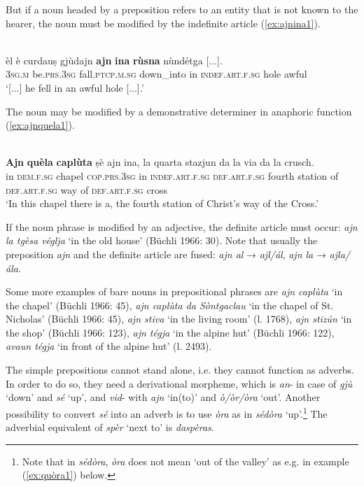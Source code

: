 But if a noun headed by a preposition refers to an entity that is not known to the hearer, the noun must be modified by the indefinite article (\ref{ex:ajnina1}).

\ea
\label{ex:ajnina1}
\\
\gll  [...] èl è curdauṣ gjùdajn \textbf{ajn} \textbf{ina} \textbf{rùsna} nùndétga [...].\\
{} \textsc{3sg.m} be.\textsc{prs.3sg} fall.\textsc{ptcp.m.sg} down\_into in \textsc{indef.art.f.sg} hole awful\\
\glt `[...] he fell in an awful hole [...].'
\z

The noun may be modified by a demonstrative determiner in anaphoric function (\ref{ex:ajnquela1}).

\ea
\label{ex:ajnquela1}
\\
\gll \textbf{Ajn} \textbf{quèla} \textbf{caplùta} ṣè ajn ina, la quarta stazjun da la via da la crusch.\\
in \textsc{dem.f.sg} chapel \textsc{cop.prs.3sg} in \textsc{indef.art.f.sg} \textsc{def.art.f.sg} fourth station of \textsc{def.art.f.sg} way of \textsc{def.art.f.sg} cross \\
\glt `In this chapel there is a, the fourth station of Christ’s way of the Cross.'
\z

If the noun phrase is modified by an adjective, the definite article must occur: \textit{ajn la tgèsa véglja} `in the old house' (Büchli 1966: 30). Note that usually the preposition \textit{ajn} and the definite article are fused: \textit{ajn al} → \textit{ajl/ál}, \textit{ajn la} → \textit{ajla/ála}.

Some more examples of bare nouns in prepositional phrases are \textit{ajn caplùta} `in the chapel' (Büchli 1966: 45), \textit{ajn caplùta da Sòntgaclau} `in the chapel of St. Nicholas' (Büchli 1966: 45), \textit{ajn stiva} `in the living room' (l. 1768), \textit{ajn stizún} `in the shop' (Büchli 1966: 123), \textit{ajn tégja} `in the alpine hut' (Büchli 1966: 122), \textit{avaun tégja} `in front of the alpine hut' (l. 2493).


The simple prepositions cannot stand alone, i.e. they cannot function as adverbs. In order to do so, they need a derivational morpheme, which is \textit{an}- in case of \textit{gjù} `down' and \textit{sé} `up', and \textit{vid}- with \textit{ajn} `in(to)' and \textit{ò/òr/òra} `out'. Another possibility to convert \textit{sé} into an adverb is to use \textit{òra} as in \textit{sédòra} `up'.\footnote{Note that in \textit{sédòra}, \textit{òra} does not mean `out of the valley' as e.g. in example (\ref{ex:quòra1}) below.} The adverbial equivalent of \textit{spèr} `next to' is \textit{daspèras}.

